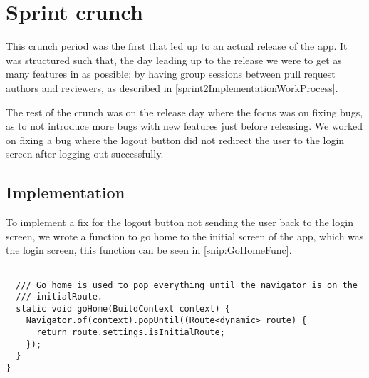 \section{Sprint crunch}
This crunch period was the first that led up to an actual release of the app.
It was structured such that, the day leading up to the release we were to get as many features in as possible; by having group sessions between pull request authors and reviewers, as described in \autoref{sprint2ImplementationWorkProcess}.

The rest of the crunch was on the release day where the focus was on fixing bugs, as to not introduce more bugs with new features just before releasing. 
We worked on fixing a bug where the logout button did not redirect the user to the login screen after logging out successfully.

\subsection{Implementation} 
To implement a fix for the logout button not sending the user back to the login screen, we wrote a function to go home to the initial screen of the app, which was the login screen, this function can be seen in \autoref{snip:GoHomeFunc}.

\begin{lstlisting}

  /// Go home is used to pop everything until the navigator is on the
  /// initialRoute.
  static void goHome(BuildContext context) {
    Navigator.of(context).popUntil((Route<dynamic> route) {
      return route.settings.isInitialRoute;
    });
  }
}
\end{lstlisting}

